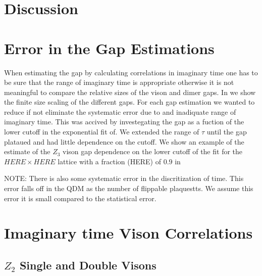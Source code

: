 \documentclass[twocolumn,prb,aps,floatfix,superscriptaddress]{revtex4-1}
\begin{document}
\section{Discussion}

\appendix
\section{Error in the Gap Estimations}
\label{appendix_gap_err}

When estimating the gap by calculating correlations in imaginary time one has to be sure
that the range of imaginary time is appropriate otherwise it is not meaningful to compare the relative 
sizes of the vison and dimer gaps. In
we show the finite size scaling of the different gaps. For each gap estimation we wanted to reduce
if not eliminate the systematic error due to and inadiquate range of imaginary time. This was
accived by investegating the gap as a fuction of the lower cutoff in the exponential fit of. We
extended the range of $\tau$ until the gap plataued and had little dependence on the cutoff. We show an
example of the estimate of the $Z_3$ vison gap dependence on the lower cutoff of the fit for the
$HERE\times HERE$ lattice with a fraction (HERE) of $0.9$ in 

NOTE: There is also some systematic error in the discritization of time. This error falls off in the QDM
as the number of flippable plaquestts. We assume this error it is small compared to the
statistical error.

\section{Imaginary time Vison Correlations}
\label{appendix_tau_corr}

    \subsection{$Z_2$ Single and Double Visons}
    
\end{document}
